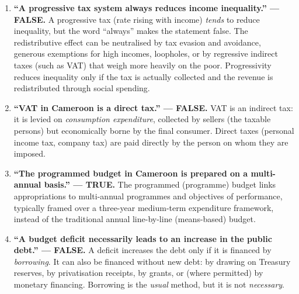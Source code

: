 \documentclass[11pt]{article}
\newcommand{\cle}[1]{{\popxbold\color{popdark}#1}}
\begin{document}
\begin{corrige}
\begin{enumerate}
\item \textbf{``A progressive tax system always reduces income inequality.'' — FALSE.} A progressive tax (rate rising with income) \emph{tends} to reduce inequality, but the word ``always'' makes the statement false. The redistributive effect can be neutralised by tax evasion and avoidance, generous exemptions for high incomes, loopholes, or by regressive indirect taxes (such as VAT) that weigh more heavily on the poor. Progressivity reduces inequality only if the tax is actually collected and the revenue is redistributed through social spending.
\item \textbf{``VAT in Cameroon is a direct tax.'' — FALSE.} VAT is an \cle{indirect tax}: it is levied on \emph{consumption expenditure}, collected by sellers (the taxable persons) but economically borne by the final consumer. Direct taxes (personal income tax, company tax) are paid directly by the person on whom they are imposed.
\item \textbf{``The programmed budget in Cameroon is prepared on a multi-annual basis.'' — TRUE.} The programmed (programme) budget links appropriations to multi-annual programmes and objectives of performance, typically framed over a three-year medium-term expenditure framework, instead of the traditional annual line-by-line (means-based) budget.
\item \textbf{``A budget deficit necessarily leads to an increase in the public debt.'' — FALSE.} A deficit increases the debt only if it is financed by \emph{borrowing}. It can also be financed without new debt: by drawing on Treasury reserves, by privatisation receipts, by grants, or (where permitted) by monetary financing. Borrowing is the \emph{usual} method, but it is not \emph{necessary}.
\end{enumerate}
\end{corrige}
\end{document}

